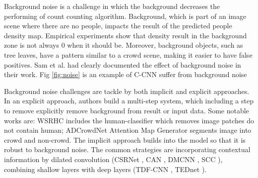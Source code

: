 Background noise is a challenge in which the background
decreases the performing of count counting algorithm.
Background, which is part of an image scene where there are
no people, impacts the result of the predicted people density
map. Empirical experiments show that density result in the
background zone is not always 0 when it should be. Moreover,
background objects, such as tree leaves, have a pattern similar
to a crowd scene, making it easier to have false positives. Sam et
al. \cite{DBLPconfaaaiSamB18} had clearly documented the effect of background noise in
their work. Fig \ref{fig:noise} is an example of C-CNN \cite{9053780} suffer from background noise

Background noise challenges are tackle by both implicit and explicit approaches. In an explicit approach, authors build a multi-step system, which including a step to remove explicitly remove background from result or input data. Some notable works are: WSRHC \cite{10.1145/3287921.3287980} includes the human-classifier which removes image patches do not contain human; ADCrowdNet \cite{liu2019adcrowdnet} Attention Map Generator segments image into crowd and non-crowd. The implicit approach builds into the model so that it is robust to background noise. The common strategies are incorporating contextual information by dilated convolution (CSRNet \cite{li2018csrnet}, CAN \cite{liu2019context}, DMCNN \cite{zhang2019crowd}, SCC \cite{9023874}), combining shallow layers with deep layers (TDF-CNN \cite{DBLPconfaaaiSamB18}, TEDnet \cite{jiang2019crowd}).


